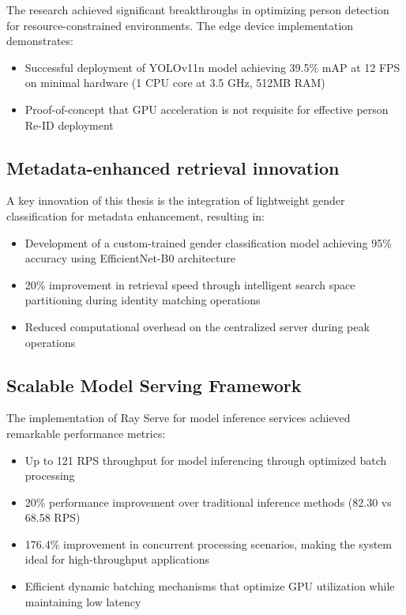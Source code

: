 \documentclass[../main.tex]{subfiles}
\begin{document}
The research achieved significant breakthroughs in optimizing person detection for resource-constrained environments. The edge device implementation demonstrates:

\begin{itemize}
    \item Successful deployment of YOLOv11n model achieving 39.5\% mAP at 12 FPS on minimal hardware (1 CPU core at 3.5 GHz, 512MB RAM)
    \item Proof-of-concept that GPU acceleration is not requisite for effective person Re-ID deployment
\end{itemize}

\subsection{Metadata-enhanced retrieval innovation}

A key innovation of this thesis is the integration of lightweight gender classification for metadata enhancement, resulting in:

\begin{itemize}
    \item Development of a custom-trained gender classification model achieving 95\% accuracy using EfficientNet-B0 architecture
    \item 20\% improvement in retrieval speed through intelligent search space partitioning during identity matching operations
    \item Reduced computational overhead on the centralized server during peak operations
\end{itemize}

\subsection{Scalable Model Serving Framework}

The implementation of Ray Serve for model inference services achieved remarkable performance metrics:

\begin{itemize}
    \item Up to 121 RPS throughput for model inferencing through optimized batch processing
    \item 20\% performance improvement over traditional inference methods (82.30 vs 68.58 RPS)
    \item 176.4\% improvement in concurrent processing scenarios, making the system ideal for high-throughput applications
    \item Efficient dynamic batching mechanisms that optimize GPU utilization while maintaining low latency
\end{itemize}
\end{document}
